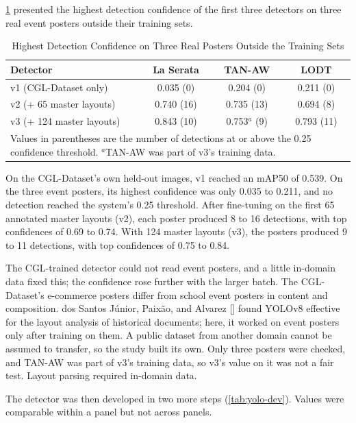 \begin{refsection}
\ref{tab:domain-gap} presented the highest detection confidence of the first three detectors on three real event posters outside their training sets.

\begin{table}[!ht]
\centering
\caption{Highest Detection Confidence on Three Real Posters Outside the Training Sets}
\label{tab:domain-gap}
\begin{tabular}{l c c c}
\hline
\textbf{Detector} & \textbf{La Serata} & \textbf{TAN-AW} & \textbf{LODT} \\ \hline
v1 (CGL-Dataset only) & 0.035 (0) & 0.204 (0) & 0.211 (0) \\
v2 (+ 65 master layouts) & 0.740 (16) & 0.735 (13) & 0.694 (8) \\
v3 (+ 124 master layouts) & 0.843 (10) & 0.753$^{a}$ (9) & 0.793 (11) \\ \hline
\multicolumn{4}{p{0.80\textwidth}}{\footnotesize Values in parentheses are the number of detections at or above the 0.25 confidence threshold. $^{a}$TAN-AW was part of v3's training data.}
\end{tabular}
\end{table}

On the CGL-Dataset's own held-out images, v1 reached an mAP50 of 0.539. On the three event posters, its highest confidence was only 0.035 to 0.211, and no detection reached the system's 0.25 threshold. After fine-tuning on the first 65 annotated master layouts (v2), each poster produced 8 to 16 detections, with top confidences of 0.69 to 0.74. With 124 master layouts (v3), the posters produced 9 to 11 detections, with top confidences of 0.75 to 0.84.

The CGL-trained detector could not read event posters, and a little in-domain data fixed this; the confidence rose further with the larger batch. The CGL-Dataset's e-commerce posters \cite{zhou2022cglgan} differ from school event posters in content and composition. dos Santos Júnior, Paixão, and Alvarez [\citeyear{dosSantosJunior2025}] found YOLOv8 effective for the layout analysis of historical documents; here, it worked on event posters only after training on them. A public dataset from another domain cannot be assumed to transfer, so the study built its own. Only three posters were checked, and TAN-AW was part of v3's training data, so v3's value on it was not a fair test. Layout parsing required in-domain data.

\clearpage
The detector was then developed in two more steps (\ref{tab:yolo-dev}). Values were comparable within a panel but not across panels.


\end{refsection}
